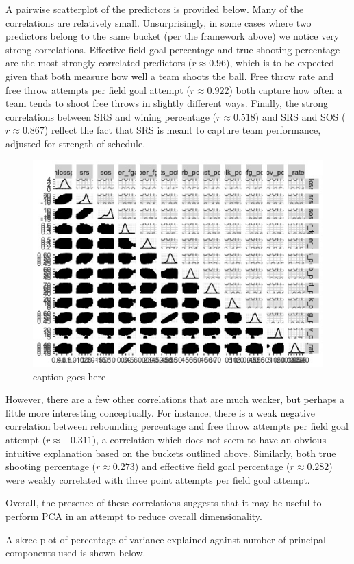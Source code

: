 \documentclass[10pt,a4paper, hidelinks]{article} %
\begin{document}
A pairwise scatterplot of the predictors is provided below. Many of the correlations are relatively small. Unsurprisingly, in some cases where two predictors belong to the same bucket (per the framework above) we notice very strong correlations. Effective field goal percentage and true shooting percentage are the most strongly correlated predictors ($r \approx 0.96$), which is to be expected given that both measure how well a team shoots the ball. Free throw rate and free throw attempts per field goal attempt ($r \approx 0.922$) both capture how often a team tends to shoot free throws in slightly different ways. Finally, the strong correlations between SRS and wining percentage ($r \approx 0.518$) and SRS and SOS ($r \approx 0.867$) reflect the fact that SRS is meant to capture team performance, adjusted for strength of schedule.

\begin{figure}[H]
	\centering
	\includegraphics[width=0.7\linewidth]{../fig/MoneyMaker}
	\caption{caption goes here}
	\label{fig:ggpairs}
\end{figure} 

However, there are a few other correlations that are much weaker, but perhaps a little more interesting conceptually. For instance, there is a weak negative correlation between rebounding percentage and free throw attempts per field goal attempt ($r \approx -0.311$), a correlation which does not seem to have an obvious intuitive explanation based on the buckets outlined above. Similarly, both true shooting percentage ($r \approx 0.273$) and effective field goal percentage ($r \approx 0.282$) were weakly correlated with three point attempts per field goal attempt.

Overall, the presence of these correlations suggests that it may be useful to perform PCA in an attempt to reduce overall dimensionality.

A skree plot of percentage of variance explained against number of principal components used is shown below. 
\end{document}
